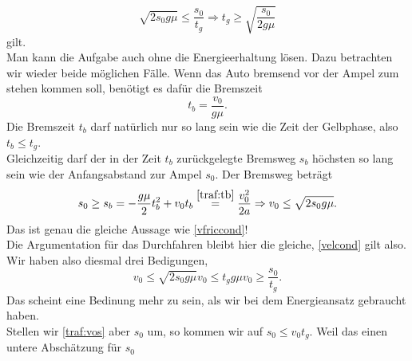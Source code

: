 \begin{Answer}[ref = ampel]
\begin{equation}
	\boxed{
	\sqrt{2s_0g\mu} \leq \frac{s_0}{t_g} \Rightarrow t_g \geq  \sqrt{\frac{s_0}{2g\mu}}}
	\end{equation}
	gilt.\\
	Man kann die Aufgabe auch ohne die Energieerhaltung lösen. Dazu betrachten wir wieder beide möglichen Fälle. Wenn das Auto bremsend vor der Ampel zum stehen kommen soll, benötigt es dafür die Bremszeit
	\begin{equation}\label{traf:tb}
		t_b = \frac{v_0}{g\mu}.
	\end{equation}
	Die Bremszeit $t_b$ darf natürlich nur so lang sein wie die Zeit der Gelbphase, also $t_b\leq t_g$.\\
	Gleichzeitig darf der in der Zeit $t_b$ zurückgelegte Bremsweg $s_b$ höchsten so lang sein wie der Anfangsabstand zur Ampel $s_0$. Der Bremsweg beträgt
	\begin{equation}\label{traf:sb}
		s_0 \geq s_b = -\frac{g\mu}{2}t_b^2 + v_0 t_b \overset{\eqref{traf:tb}}{=} \frac{v_0^2}{2a}\Rightarrow v_0 \leq \sqrt{2s_0g\mu}.
	\end{equation}
	Das ist genau die gleiche Aussage wie \eqref{vfriccond}!\\
	Die Argumentation für das Durchfahren bleibt hier die gleiche, \eqref{velcond} gilt also. Wir haben also diesmal drei Bedigungen,
	\begin{subequations}\label{traf:voc}
		\begin{equation}\label{traf:vosb}
			v_0 \leq \sqrt{2s_0 g \mu}
		\end{equation}
		\begin{equation}\label{traf:votb}
			v_0 \leq t_g g \mu 
		\end{equation}
		\begin{equation}\label{traf:vos}
			v_0 \geq \frac{s_0}{t_g}.
		\end{equation}
	\end{subequations}
	Das scheint eine Bedinung mehr zu sein, als wir bei dem Energieansatz gebraucht haben.\\
	Stellen wir \eqref{traf:vos} aber $s_0$ um, so kommen wir auf $s_0 \leq v_0 t_g$. Weil das einen untere Abschätzung für $s_0$
\end{Answer}